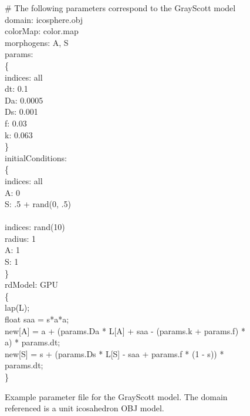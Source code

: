 \begin{figure}[p]
\LinesNotNumbered
\begin{algorithm}[H]
	\# The following parameters correspond to the GrayScott model \\	
	domain: icosphere.obj \\
	colorMap: color.map \\
	morphogens: A, S\\
	
	params:\\
	\{\\
\quad indices: all\\
\quad dt: 0.1\\
\quad Da: 0.0005\\
\quad Ds: 0.001\\
\quad f: 0.03\\
\quad k: 0.063\\
	\}\\
	initialConditions:\\
	\{\\
\quad indices: all\\
\quad A: 0\\
\quad S: .5 + rand(0, .5)\\
\quad \\
\quad indices: rand(10)\\
\quad radius: 1\\
\quad A: 1\\
\quad S: 1\\
	\}\\
	rdModel: GPU\\
	\{\\
\quad lap(L);\\
\quad float saa = s*a*a;\\
\quad new[A] = a + (params.Da * L[A] + saa - (params.k + params.f) * a) * params.dt;\\
\quad new[S] = s + (params.Ds * L[S] - saa + params.f * (1 - s)) * params.dt;\\
	\}
\end{algorithm}
	\caption{Example parameter file for the GrayScott model. The domain referenced is a unit icosahedron OBJ model.}
	\label{fig:paramFileExample}
\end{figure}

